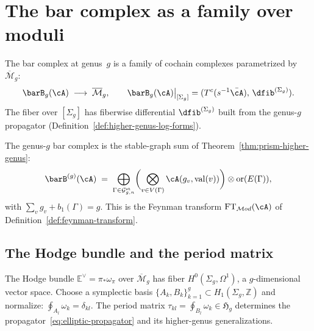 \section{The bar complex as a family over moduli}
\label{sec:geometric-prologue}
\label{subsec:bar-family-moduli}

The bar complex at genus~$g$ is a family of cochain complexes
parametrized by $\overline{\mathcal{M}}_g$:
\begin{equation}\label{eq:bar-family}
\barB_g(\cA) \;\longrightarrow\; \overline{\mathcal{M}}_g,
\qquad
\barB_g(\cA)\big|_{[\Sigma_g]}
= (T^c(s^{-1}\bar{\cA}),\, \dfib^{(\Sigma_g)}).
\end{equation}
The fiber over $[\Sigma_g]$ has fiberwise differential
$\dfib^{(\Sigma_g)}$ built from the genus-$g$ propagator
(Definition~\ref{def:higher-genus-log-forms}).

\begin{remark}
\label{rem:bar-stable-graph-sum}
The genus-$g$ bar complex is the stable-graph sum of
Theorem~\ref{thm:prism-higher-genus}:
\begin{equation}\label{eq:bar-graph-sum}
\barB^{(g)}(\cA)
\;=\;
\bigoplus_{\Gamma \in \mathcal{G}^{\mathrm{st}}_{g,n}}
\biggl(\bigotimes_{v \in V(\Gamma)}
\cA(g_v, \operatorname{val}(v))\biggr)
\otimes \operatorname{or}(E(\Gamma)),
\end{equation}
with $\sum_v g_v + b_1(\Gamma) = g$.  This is the Feynman transform
$\mathrm{FT}_{\mathcal{M}od}(\cA)$ of
Definition~\ref{def:feynman-transform}.
\end{remark}

\subsection{The Hodge bundle and the period matrix}
\label{subsec:hodge-curvature-origin}

The Hodge bundle $\mathbb{E}^\vee = \pi_*\omega_\pi$ over
$\overline{\mathcal{M}}_g$ has fiber
$H^0(\Sigma_g, \Omega^1)$, a $g$-dimensional vector space.
Choose a symplectic basis
$\{A_k, B_k\}_{k=1}^g \subset H_1(\Sigma_g, \mathbb{Z})$ and
normalize: $\oint_{A_l} \omega_k = \delta_{kl}$.  The period matrix
$\tau_{kl} = \oint_{B_l} \omega_k \in \mathfrak{H}_g$ determines
the propagator~\eqref{eq:elliptic-propagator} and its higher-genus
generalizations.


